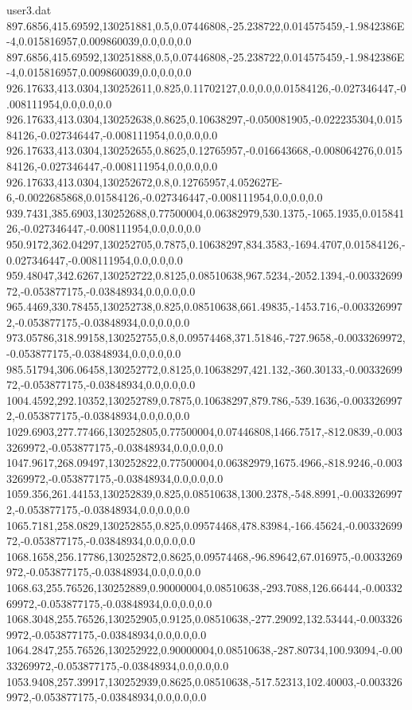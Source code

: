 \begin{filecontents}{user3.dat}
897.6856,415.69592,130251881,0.5,0.07446808,-25.238722,0.014575459,-1.9842386E-4,0.015816957,0.009860039,0.0,0.0,0.0
897.6856,415.69592,130251888,0.5,0.07446808,-25.238722,0.014575459,-1.9842386E-4,0.015816957,0.009860039,0.0,0.0,0.0
926.17633,413.0304,130252611,0.825,0.11702127,0.0,0.0,0.01584126,-0.027346447,-0.008111954,0.0,0.0,0.0
926.17633,413.0304,130252638,0.8625,0.10638297,-0.050081905,-0.022235304,0.01584126,-0.027346447,-0.008111954,0.0,0.0,0.0
926.17633,413.0304,130252655,0.8625,0.12765957,-0.016643668,-0.008064276,0.01584126,-0.027346447,-0.008111954,0.0,0.0,0.0
926.17633,413.0304,130252672,0.8,0.12765957,4.052627E-6,-0.0022685868,0.01584126,-0.027346447,-0.008111954,0.0,0.0,0.0
939.7431,385.6903,130252688,0.77500004,0.06382979,530.1375,-1065.1935,0.01584126,-0.027346447,-0.008111954,0.0,0.0,0.0
950.9172,362.04297,130252705,0.7875,0.10638297,834.3583,-1694.4707,0.01584126,-0.027346447,-0.008111954,0.0,0.0,0.0
959.48047,342.6267,130252722,0.8125,0.08510638,967.5234,-2052.1394,-0.0033269972,-0.053877175,-0.03848934,0.0,0.0,0.0
965.4469,330.78455,130252738,0.825,0.08510638,661.49835,-1453.716,-0.0033269972,-0.053877175,-0.03848934,0.0,0.0,0.0
973.05786,318.99158,130252755,0.8,0.09574468,371.51846,-727.9658,-0.0033269972,-0.053877175,-0.03848934,0.0,0.0,0.0
985.51794,306.06458,130252772,0.8125,0.10638297,421.132,-360.30133,-0.0033269972,-0.053877175,-0.03848934,0.0,0.0,0.0
1004.4592,292.10352,130252789,0.7875,0.10638297,879.786,-539.1636,-0.0033269972,-0.053877175,-0.03848934,0.0,0.0,0.0
1029.6903,277.77466,130252805,0.77500004,0.07446808,1466.7517,-812.0839,-0.0033269972,-0.053877175,-0.03848934,0.0,0.0,0.0
1047.9617,268.09497,130252822,0.77500004,0.06382979,1675.4966,-818.9246,-0.0033269972,-0.053877175,-0.03848934,0.0,0.0,0.0
1059.356,261.44153,130252839,0.825,0.08510638,1300.2378,-548.8991,-0.0033269972,-0.053877175,-0.03848934,0.0,0.0,0.0
1065.7181,258.0829,130252855,0.825,0.09574468,478.83984,-166.45624,-0.0033269972,-0.053877175,-0.03848934,0.0,0.0,0.0
1068.1658,256.17786,130252872,0.8625,0.09574468,-96.89642,67.016975,-0.0033269972,-0.053877175,-0.03848934,0.0,0.0,0.0
1068.63,255.76526,130252889,0.90000004,0.08510638,-293.7088,126.66444,-0.0033269972,-0.053877175,-0.03848934,0.0,0.0,0.0
1068.3048,255.76526,130252905,0.9125,0.08510638,-277.29092,132.53444,-0.0033269972,-0.053877175,-0.03848934,0.0,0.0,0.0
1064.2847,255.76526,130252922,0.90000004,0.08510638,-287.80734,100.93094,-0.0033269972,-0.053877175,-0.03848934,0.0,0.0,0.0
1053.9408,257.39917,130252939,0.8625,0.08510638,-517.52313,102.40003,-0.0033269972,-0.053877175,-0.03848934,0.0,0.0,0.0

\end{filecontents}
